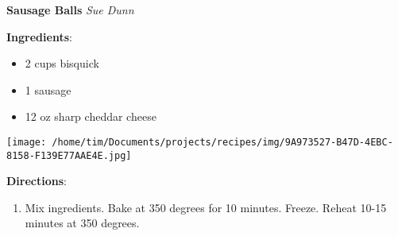 \documentclass[11pt, twoside, openany]{book}
\begin{document}
\noindent\begin{minipage}[t]{\linewidth}%
{\Large\textbf{Sausage Balls}} \label{sausage-balls}\hfill\textit{Sue Dunn}\\
\noindent\begin{minipage}[t]{0.78\linewidth}%
\textbf{Ingredients}:\vspace{-3mm}
\begin{multicols}{2}
\begin{itemize}\setlength\itemsep{-1mm}
\item 2 cups bisquick
\item 1 sausage
\item 12 oz sharp cheddar cheese
\end{itemize}
\end{multicols}
\end{minipage}
\noindent\begin{minipage}[t]{0.18\linewidth}
\centering \strut\vspace*{-\baselineskip}\newline
\texttt{[image: /home/tim/Documents/projects/recipes/img/9A973527-B47D-4EBC-8158-F139E77AAE4E.jpg]}\\
\end{minipage}\vspace{3mm}
\textbf{Directions}:
\vspace{-3mm}\begin{enumerate}\setlength\itemsep{-1mm}
\item Mix ingredients. Bake at 350 degrees for 10 minutes. Freeze. Reheat 10-15 minutes at 350 degrees.
\end{enumerate}
\end{minipage}\vspace{8mm}
\end{document}
